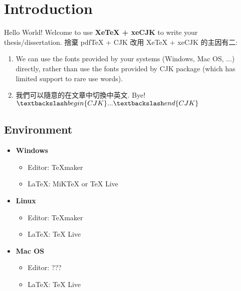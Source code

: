 \chapter{Introduction}
\label{chapter:intro}

Hello World! Welcome to use \textbf{XeTeX + xeCJK} to write your thesis/dissertation.
捨棄 pdfTeX + CJK 改用 XeTeX + xeCJK 的主因有二:
\begin{enumerate}

\item We can use the fonts provided by your systems (Windows, Mac OS, ...) directly, rather than use the fonts provided by CJK package (which has limited support to rare use words).

\item 我們可以隨意的在文章中切換中英文.
Bye! $\textbackslash begin\{CJK\} ... \textbackslash end\{CJK\}$

\end{enumerate}

\section{Environment}

\begin{itemize}

\item \textbf{Windows}
\begin{itemize}
  \item Editor: TeXmaker
  \item \LaTeX: MiKTeX or TeX Live
\end{itemize}

\item \textbf{Linux}
\begin{itemize}
  \item Editor: TeXmaker
  \item \LaTeX: TeX Live
\end{itemize}

\item \textbf{Mac OS}
\begin{itemize}
  \item Editor: ???
  \item \LaTeX: TeX Live
\end{itemize}

\end{itemize}
